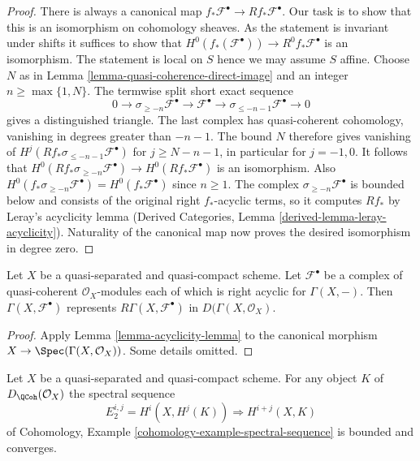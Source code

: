 \begin{proof}
There is always a canonical map
$f_*\mathcal{F}^\bullet \to Rf_*\mathcal{F}^\bullet$.
Our task is to show that this is an isomorphism on cohomology sheaves.
As the statement is invariant under shifts it suffices to show that
$H^0(f_*(\mathcal{F}^\bullet)) \to R^0f_*\mathcal{F}^\bullet$
is an isomorphism. The statement is local on $S$ hence we
may assume $S$ affine. Choose $N$ as in
Lemma \ref{lemma-quasi-coherence-direct-image} and an integer
$n \geq \max\{1, N\}$. The termwise split short exact sequence
$$
0 \to \sigma_{\geq -n}\mathcal{F}^\bullet \to
\mathcal{F}^\bullet \to \sigma_{\leq -n-1}\mathcal{F}^\bullet \to 0
$$
gives a distinguished triangle. The last complex has quasi-coherent
cohomology, vanishing in degrees greater than $-n-1$. The bound $N$
therefore gives vanishing of
$H^j(Rf_*\sigma_{\leq -n-1}\mathcal{F}^\bullet)$ for $j \geq N-n-1$,
in particular for $j=-1,0$. It follows that
$H^0(Rf_*\sigma_{\geq -n}\mathcal{F}^\bullet) \to
H^0(Rf_*\mathcal{F}^\bullet)$ is an isomorphism.
Also $H^0(f_*\sigma_{\geq -n}\mathcal{F}^\bullet) =
H^0(f_*\mathcal{F}^\bullet)$ since $n \geq 1$.
The complex $\sigma_{\geq -n}\mathcal{F}^\bullet$ is bounded below
and consists of the original right $f_*$-acyclic terms, so it computes
$Rf_*$ by Leray's acyclicity lemma (Derived Categories, Lemma
\ref{derived-lemma-leray-acyclicity}). Naturality of the canonical map
now proves the desired isomorphism in degree zero.
\end{proof}

\begin{lemma}
\label{lemma-acyclicity-lemma-global}
Let $X$ be a quasi-separated and quasi-compact scheme.
Let $\mathcal{F}^\bullet$ be a complex of quasi-coherent
$\mathcal{O}_X$-modules each of which is right acyclic for $\Gamma(X, -)$.
Then $\Gamma(X, \mathcal{F}^\bullet)$ represents
$R\Gamma(X, \mathcal{F}^\bullet)$ in $D(\Gamma(X, \mathcal{O}_X)$.
\end{lemma}

\begin{proof}
Apply Lemma \ref{lemma-acyclicity-lemma} to the canonical morphism
$X \to \Spec(\Gamma(X, \mathcal{O}_X))$. Some details omitted.
\end{proof}

\begin{lemma}
\label{lemma-spectral-sequence}
Let $X$ be a quasi-separated and quasi-compact scheme. For any object
$K$ of $D_\QCoh(\mathcal{O}_X)$ the spectral sequence
$$
E_2^{i, j} = H^i(X, H^j(K)) \Rightarrow H^{i + j}(X, K)
$$
of Cohomology, Example \ref{cohomology-example-spectral-sequence}
is bounded and converges.
\end{lemma}

